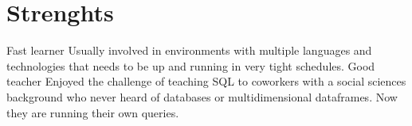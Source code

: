 \documentclass[]{cv-style}          %
\begin{document}

\section{Strenghts}
\begin{entrylist}
\entry
  {}
  {Fast learner}
  {}
  {Usually involved in environments with multiple languages and technologies that needs to be up and running in very tight schedules.}
\entry
  {}
  {Good teacher}
  {}
  {Enjoyed the challenge of teaching SQL to coworkers with a social sciences background who never heard of databases or multidimensional dataframes. Now they are running their own queries.}
\end{entrylist}
\end{document}
